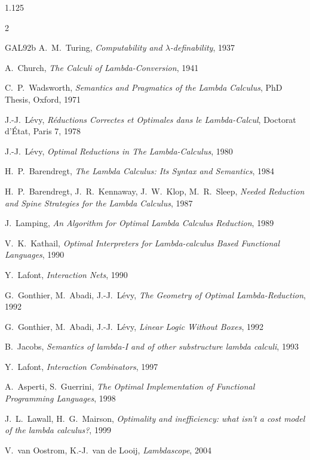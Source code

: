 \documentclass[10pt]{article}
\begin{document}
\begin{spacing}{1.125}
\begin{multicols}{2}
\begin{thebibliography}{GAL92b}
  A.~M.~Turing,
  \emph{Computability and $\lambda$-definability},
  1937

  A.~Church,
  \emph{The Calculi of Lambda-Conversion},
  1941

  C.~P.~Wadsworth,
  \emph{Semantics and Pragmatics of the Lambda Calculus}, PhD Thesis, Oxford, 1971

  J.-J.~Lévy,
  \emph{Réductions Correctes et Optimales dans le Lambda-Calcul}, Doctorat d’État, Paris 7, 1978

  J.-J.~Lévy,
  \emph{Optimal Reductions in The Lambda-Calculus},
  1980

  H.~P.~Barendregt,
  \emph{The Lambda Calculus: Its Syntax and Semantics},
  1984

  H.~P.~Barendregt, J.~R.~Kennaway, J.~W.~Klop, M.~R.~Sleep,
  \emph{Needed Reduction and Spine Strategies for the Lambda Calculus},
  1987

  J.~Lamping,
  \emph{An Algorithm for Optimal Lambda Calculus Reduction},
  1989

  V.~K.~Kathail,
  \emph{Optimal Interpreters for Lambda-calculus Based Functional Languages},
  1990

  Y.~Lafont,
  \emph{Interaction Nets},
  1990

  G.~Gonthier, M.~Abadi, J.-J.~Lévy,
  \emph{The Geometry of Optimal Lambda-Reduction},
  1992

  G.~Gonthier, M.~Abadi, J.-J.~Lévy,
  \emph{Linear Logic Without Boxes},
  1992

  B.~Jacobs,
  \emph{Semantics of lambda-I and of other substructure lambda calculi},
  1993

  Y.~Lafont,
  \emph{Interaction Combinators},
  1997

  A.~Asperti, S.~Guerrini,
  \emph{The Optimal Implementation of Functional Programming Languages},
  1998

  J.~L.~Lawall, H.~G.~Mairson,
  \emph{Optimality and inefficiency: what isn't a cost model of the lambda calculus?},
  1999

  V.~van Oostrom, K.-J.~van de Looij,
  \emph{Lambdascope},
  2004

\end{thebibliography}

\end{multicols}
\end{spacing}
\end{document}
